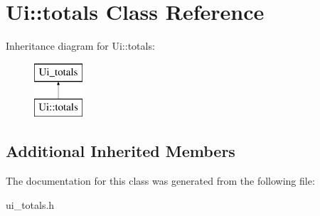 \hypertarget{class_ui_1_1totals}{}\section{Ui\+:\+:totals Class Reference}
\label{class_ui_1_1totals}
Inheritance diagram for Ui\+:\+:totals\+:\begin{figure}[H]
\begin{center}
\leavevmode
\includegraphics[height=2.000000cm]{class_ui_1_1totals}
\end{center}
\end{figure}
\subsection*{Additional Inherited Members}


The documentation for this class was generated from the following file\+:\begin{DoxyCompactItemize}
\item 
ui\+\_\+totals.\+h\end{DoxyCompactItemize}
